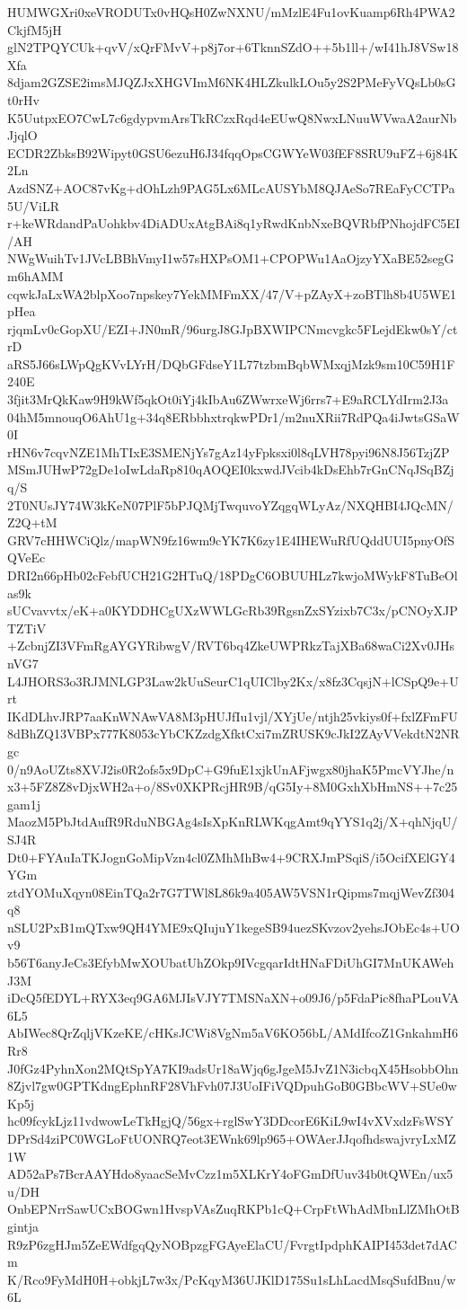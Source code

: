HUMWGXri0xeVRODUTx0vHQsH0ZwNXNU/mMzlE4Fu1ovKuamp6Rh4PWA2CkjfM5jH
glN2TPQYCUk+qvV/xQrFMvV+p8j7or+6TknnSZdO++5b1ll+/wI41hJ8VSw18Xfa
8djam2GZSE2imsMJQZJxXHGVImM6NK4HLZkulkLOu5y2S2PMeFyVQsLb0sGt0rHv
K5UutpxEO7CwL7c6gdypvmArsTkRCzxRqd4eEUwQ8NwxLNuuWVwaA2aurNbJjqlO
ECDR2ZbksB92Wipyt0GSU6ezuH6J34fqqOpsCGWYeW03fEF8SRU9uFZ+6j84K2Ln
AzdSNZ+AOC87vKg+dOhLzh9PAG5Lx6MLcAUSYbM8QJAeSo7REaFyCCTPa5U/ViLR
r+keWRdandPaUohkbv4DiADUxAtgBAi8q1yRwdKnbNxeBQVRbfPNhojdFC5EI/AH
NWgWuihTv1JVcLBBhVmyI1w57sHXPsOM1+CPOPWu1AaOjzyYXaBE52segGm6hAMM
cqwkJaLxWA2blpXoo7npskey7YekMMFmXX/47/V+pZAyX+zoBTlh8b4U5WE1pHea
rjqmLv0cGopXU/EZI+JN0mR/96urgJ8GJpBXWIPCNmcvgkc5FLejdEkw0sY/ctrD
aRS5J66sLWpQgKVvLYrH/DQbGFdseY1L77tzbmBqbWMxqjMzk9sm10C59H1F240E
3fjit3MrQkKaw9H9kWf5qkOt0iYj4kIbAu6ZWwrxeWj6rrs7+E9aRCLYdIrm2J3a
04hM5mnouqO6AhU1g+34q8ERbbhxtrqkwPDr1/m2nuXRii7RdPQa4iJwtsGSaW0I
rHN6v7cqvNZE1MhTIxE3SMENjYs7gAz14yFpksxi0l8qLVH78pyi96N8J56TzjZP
MSmJUHwP72gDe1oIwLdaRp810qAOQEI0kxwdJVcib4kDsEhb7rGnCNqJSqBZjq/S
2T0NUsJY74W3kKeN07PlF5bPJQMjTwquvoYZqgqWLyAz/NXQHBI4JQcMN/Z2Q+tM
GRV7cHHWCiQlz/mapWN9fz16wm9cYK7K6zy1E4IHEWuRfUQddUUI5pnyOfSQVeEc
DRI2n66pHb02cFebfUCH21G2HTuQ/18PDgC6OBUUHLz7kwjoMWykF8TuBeOlas9k
sUCvavvtx/eK+a0KYDDHCgUXzWWLGcRb39RgsnZxSYzixb7C3x/pCNOyXJPTZTiV
+ZcbnjZI3VFmRgAYGYRibwgV/RVT6bq4ZkeUWPRkzTajXBa68waCi2Xv0JHsnVG7
L4JHORS3o3RJMNLGP3Law2kUuSeurC1qUIClby2Kx/x8fz3CqsjN+lCSpQ9e+Urt
IKdDLhvJRP7aaKnWNAwVA8M3pHUJfIu1vjl/XYjUe/ntjh25vkiys0f+fxlZFmFU
8dBhZQ13VBPx777K8053cYbCKZzdgXfktCxi7mZRUSK9cJkI2ZAyVVekdtN2NRgc
0/n9AoUZts8XVJ2is0R2ofs5x9DpC+G9fuE1xjkUnAFjwgx80jhaK5PmcVYJhe/n
x3+5FZ8Z8vDjxWH2a+o/8Sv0XKPRcjHR9B/qG5Iy+8M0GxhXbHmNS++7c25gam1j
MaozM5PbJtdAufR9RduNBGAg4sIsXpKnRLWKqgAmt9qYYS1q2j/X+qhNjqU/SJ4R
Dt0+FYAuIaTKJognGoMipVzn4cl0ZMhMhBw4+9CRXJmPSqiS/i5OcifXElGY4YGm
ztdYOMuXqyn08EinTQa2r7G7TWl8L86k9a405AW5VSN1rQipms7mqjWevZf304q8
nSLU2PxB1mQTxw9QH4YME9xQIujuY1kegeSB94uezSKvzov2yehsJObEc4s+UOv9
b56T6anyJeCs3EfybMwXOUbatUhZOkp9IVcgqarIdtHNaFDiUhGI7MnUKAWehJ3M
iDcQ5fEDYL+RYX3eq9GA6MJIsVJY7TMSNaXN+o09J6/p5FdaPic8fhaPLouVA6L5
AbIWec8QrZqljVKzeKE/cHKsJCWi8VgNm5aV6KO56bL/AMdIfcoZ1GnkahmH6Rr8
J0fGz4PyhnXon2MQtSpYA7KI9adsUr18aWjq6gJgeM5JvZ1N3icbqX45HsobbOhn
8Zjvl7gw0GPTKdngEphnRF28VhFvh07J3UoIFiVQDpuhGoB0GBbcWV+SUe0wKp5j
hc09fcykLjz11vdwowLeTkHgjQ/56gx+rglSwY3DDcorE6KiL9wI4vXVxdzFsWSY
DPrSd4ziPC0WGLoFtUONRQ7eot3EWnk69lp965+OWAerJJqofhdswajvryLxMZ1W
AD52aPs7BcrAAYHdo8yaacSeMvCzz1m5XLKrY4oFGmDfUuv34b0tQWEn/ux5u/DH
OnbEPNrrSawUCxBOGwn1HvspVAsZuqRKPb1cQ+CrpFtWhAdMbnLlZMhOtBgintja
R9zP6zgHJm5ZeEWdfgqQyNOBpzgFGAyeElaCU/FvrgtIpdphKAIPI453det7dACm
K/Rco9FyMdH0H+obkjL7w3x/PcKqyM36UJKlD175Su1sLhLacdMsqSufdBnu/w6L
